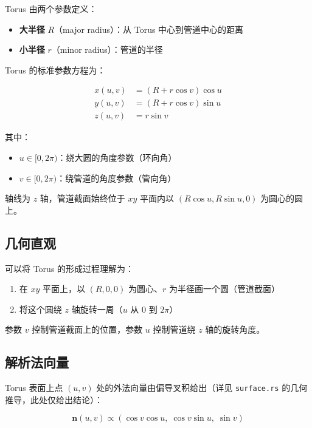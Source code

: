 \documentclass[12pt,a4paper]{article}
\begin{document}
Torus 由两个参数定义：
\begin{itemize}
\item \textbf{大半径} $R$（major radius）：从 Torus 中心到管道中心的距离
\item \textbf{小半径} $r$（minor radius）：管道的半径
\end{itemize}

Torus 的标准参数方程为：

\begin{equation}
\begin{aligned}
x(u,v) &= (R + r\cos v)\cos u \\
y(u,v) &= (R + r\cos v)\sin u \\
z(u,v) &= r\sin v
\end{aligned}
\label{eq:torus-param}
\end{equation}

其中：
\begin{itemize}
\item $u \in [0, 2\pi)$：绕大圆的角度参数（环向角）
\item $v \in [0, 2\pi)$：绕管道的角度参数（管向角）
\end{itemize}

轴线为 $z$ 轴，管道截面始终位于 $xy$ 平面内以 $(R\cos u, R\sin u, 0)$ 为圆心的圆上。

\subsection{几何直观}

可以将 Torus 的形成过程理解为：
\begin{enumerate}
\item 在 $xy$ 平面上，以 $(R, 0, 0)$ 为圆心、$r$ 为半径画一个圆（管道截面）
\item 将这个圆绕 $z$ 轴旋转一周（$u$ 从 $0$ 到 $2\pi$）
\end{enumerate}

参数 $v$ 控制管道截面上的位置，参数 $u$ 控制管道绕 $z$ 轴的旋转角度。

\subsection{解析法向量}

Torus 表面上点 $(u,v)$ 处的外法向量由偏导叉积给出（详见 \texttt{surface.rs} 的几何推导，此处仅给出结论）：

\begin{equation}
\mathbf{n}(u,v) \propto (\cos v\cos u,\; \cos v\sin u,\; \sin v)
\label{eq:torus-normal}
\end{equation}
\end{document}
